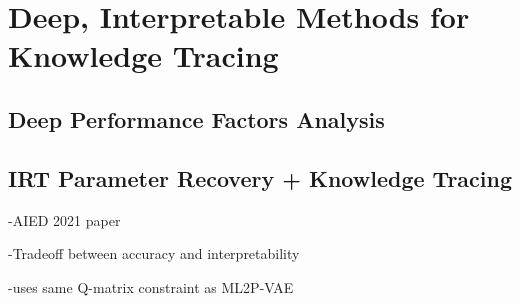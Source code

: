 \chapter{Deep, Interpretable Methods for Knowledge Tracing} \label{ch:kt_methods}


\section{Deep Performance Factors Analysis}


\section{IRT Parameter Recovery + Knowledge Tracing}
-AIED 2021 paper

-Tradeoff between accuracy and interpretability

-uses same Q-matrix constraint as ML2P-VAE

